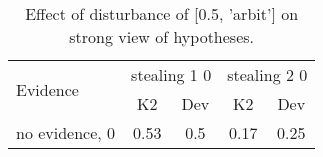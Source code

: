 \begin{table}\begin{tabular}{l|cc|cc}\toprule\multirow{2}{*}{Evidence} & \multicolumn{2}{c}{stealing 1 0}& \multicolumn{2}{c}{stealing 2 0}\\& {K2} & {Dev}& {K2} & {Dev}\\\midrule
no evidence, 0 & 0.53&0.5&\cellcolor{Bittersweet}0.17&\cellcolor{Bittersweet}0.25\\\bottomrule\end{tabular}\caption{Effect of disturbance of [0.5, 'arbit'] on strong view of hypotheses.}\end{table}